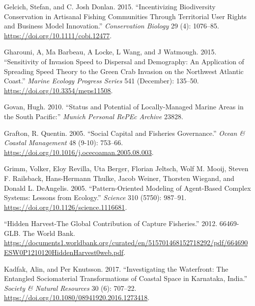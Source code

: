 \documentclass[
]{article}
\newlength{\cslhangindent}
\newlength{\cslentryspacingunit} %
\newenvironment{CSLReferences}[2] %
 {%
  \setlength{\parindent}{0pt}
  \ifodd #1
  \let\oldpar\par
  \def\par{\hangindent=\cslhangindent\oldpar}
  \fi
  \setlength{\parskip}{#2\cslentryspacingunit}
 }%
 {}
\begin{document}
\begin{CSLReferences}{1}{0}
\leavevmode{}%
Gelcich, Stefan, and C. Josh Donlan. 2015. {``Incentivizing Biodiversity Conservation in Artisanal Fishing Communities Through Territorial User Rights and Business Model Innovation.''} \emph{Conservation Biology} 29 (4): 1076--85. \url{https://doi.org/10.1111/cobi.12477}.

\leavevmode{}%
Gharouni, A, Ma Barbeau, A Locke, L Wang, and J Watmough. 2015. {``Sensitivity of Invasion Speed to Dispersal and Demography: An Application of Spreading Speed Theory to the Green Crab Invasion on the Northwest {Atlantic} Coast.''} \emph{Marine Ecology Progress Series} 541 (December): 135--50. \url{https://doi.org/10.3354/meps11508}.

\leavevmode{}%
Govan, Hugh. 2010. {``Status and Potential of Locally-Managed Marine Areas in the {South} {Pacific}:''} \emph{Munich Personal RePEc Archive} 23828.

\leavevmode{}%
Grafton, R. Quentin. 2005. {``Social Capital and Fisheries Governance.''} \emph{Ocean \& Coastal Management} 48 (9-10): 753--66. \url{https://doi.org/10.1016/j.ocecoaman.2005.08.003}.

\leavevmode{}%
Grimm, Volker, Eloy Revilla, Uta Berger, Florian Jeltsch, Wolf M. Mooij, Steven F. Railsback, Hans-Hermann Thulke, Jacob Weiner, Thorsten Wiegand, and Donald L. DeAngelis. 2005. {``Pattern-{Oriented} {Modeling} of {Agent}-{Based} {Complex} {Systems}: {Lessons} from {Ecology}.''} \emph{Science} 310 (5750): 987--91. \url{https://doi.org/10.1126/science.1116681}.

\leavevmode{}%
{``Hidden {Harvest}-{The} {Global} {Contribution} of {Capture} {Fisheries}.''} 2012. 66469-GLB. The World Bank. \url{https://documents1.worldbank.org/curated/en/515701468152718292/pdf/664690ESW0P1210120HiddenHarvest0web.pdf}.

\leavevmode{}%
Kadfak, Alin, and Per Knutsson. 2017. {``Investigating the {Waterfront}: {The} {Entangled} {Sociomaterial} {Transformations} of {Coastal} {Space} in {Karnataka}, {India}.''} \emph{Society \& Natural Resources} 30 (6): 707--22. \url{https://doi.org/10.1080/08941920.2016.1273418}.


\end{CSLReferences}
\end{document}
